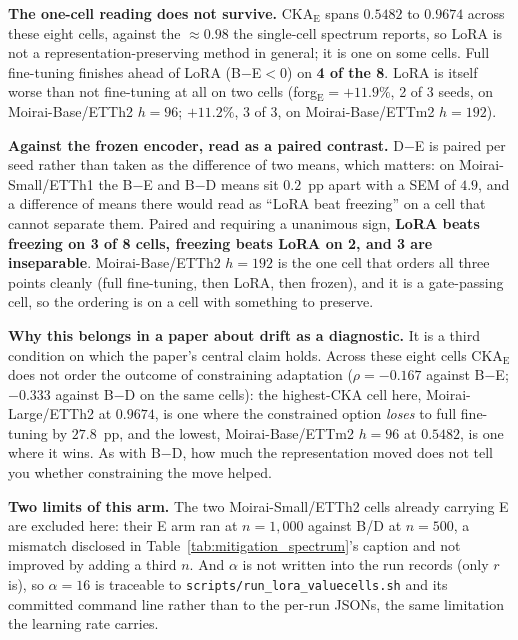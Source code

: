 \textbf{The one-cell reading does not survive.} CKA$_\text{E}$ spans
$0.5482$ to $0.9674$ across these eight cells, against the ${\approx}0.98$ the
single-cell spectrum reports, so LoRA is not a representation-preserving method
in general; it is one on some cells. Full fine-tuning finishes ahead of LoRA
(B$-$E${}<0$) on \textbf{4 of the 8}. LoRA is itself worse than not fine-tuning
at all on two cells (forg$_\text{E}={+}11.9\%$, 2 of 3 seeds, on
Moirai-Base/ETTh2 $h{=}96$; ${+}11.2\%$, 3 of 3, on Moirai-Base/ETTm2
$h{=}192$).

\textbf{Against the frozen encoder, read as a paired contrast.} D$-$E is paired
per seed rather than taken as the difference of two means, which matters: on
Moirai-Small/ETTh1 the B$-$E and B$-$D means sit $0.2$~pp apart with a SEM of
$4.9$, and a difference of means there would read as ``LoRA beat freezing'' on
a cell that cannot separate them. Paired and requiring a unanimous sign,
\textbf{LoRA beats freezing on 3 of 8 cells, freezing beats LoRA on 2, and 3 are
inseparable}. Moirai-Base/ETTh2 $h{=}192$ is the one cell that orders all three
points cleanly (full fine-tuning, then LoRA, then frozen), and it is a
gate-passing cell, so the ordering is on a cell with something to preserve.

\textbf{Why this belongs in a paper about drift as a diagnostic.} It is a third
condition on which the paper's central claim holds. Across these eight cells
CKA$_\text{E}$ does not order the outcome of constraining adaptation
($\rho{=}{-}0.167$ against B$-$E; ${-}0.333$ against B$-$D on the same cells):
the highest-CKA cell here, Moirai-Large/ETTh2 at $0.9674$, is one where the
constrained option \emph{loses} to full fine-tuning by $27.8$~pp, and the
lowest, Moirai-Base/ETTm2 $h{=}96$ at $0.5482$, is one where it wins. As with
B$-$D, how much the representation moved does not tell you whether constraining
the move helped.

\textbf{Two limits of this arm.} The two Moirai-Small/ETTh2 cells already
carrying E are excluded here: their E arm ran at $n{=}1{,}000$ against B/D at
$n{=}500$, a mismatch disclosed in Table~\ref{tab:mitigation_spectrum}'s caption
and not improved by adding a third $n$. And $\alpha$ is not written into the run
records (only $r$ is), so $\alpha{=}16$ is traceable to
\texttt{scripts/run\_lora\_valuecells.sh} and its committed command line rather
than to the per-run JSONs, the same limitation the learning rate carries.

